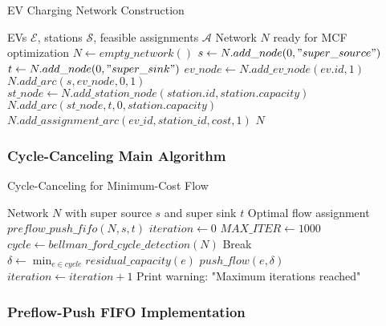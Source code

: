 \documentclass[12pt,a4paper]{article}
\begin{document}
\begin{algorithm}
\caption{EV Charging Network Construction}
\begin{algorithmic}[1]
\REQUIRE EVs $\mathcal{E}$, stations $\mathcal{S}$, feasible assignments $\mathcal{A}$
\ENSURE Network $N$ ready for MCF optimization
\STATE $N \leftarrow empty\_network()$
\STATE $s \leftarrow N.add\_node(0, "super\_source")$ 
\STATE $t \leftarrow N.add\_node(0, "super\_sink")$ 
    \STATE $ev\_node \leftarrow N.add\_ev\_node(ev.id, 1)$ 
    \STATE $N.add\_arc(s, ev\_node, 0, 1)$ 
\ENDFOR
{}
    \STATE $st\_node \leftarrow N.add\_station\_node(station.id, station.capacity)$
    \STATE $N.add\_arc(st\_node, t, 0, station.capacity)$ 
\ENDFOR
{}
    \STATE $N.add\_assignment\_arc(ev\_id, station\_id, cost, 1)$
\ENDFOR
\RETURN $N$
\end{algorithmic}
\end{algorithm}

\subsubsection{Cycle-Canceling Main Algorithm}

\begin{algorithm}
\caption{Cycle-Canceling for Minimum-Cost Flow}
\begin{algorithmic}[1]
\REQUIRE Network $N$ with super source $s$ and super sink $t$
\ENSURE Optimal flow assignment
\STATE $preflow\_push\_fifo(N, s, t)$ 
\STATE $iteration \leftarrow 0$
\STATE $MAX\_ITER \leftarrow 1000$
    \STATE $cycle \leftarrow bellman\_ford\_cycle\_detection(N)$
        \STATE Break 
    \ENDIF
    \STATE $\delta \leftarrow \min_{e \in cycle} residual\_capacity(e)$
        \STATE $push\_flow(e, \delta)$
    \ENDFOR
    \STATE $iteration \leftarrow iteration + 1$
\ENDWHILE
{}
    \STATE Print warning: "Maximum iterations reached"
\ENDIF
\end{algorithmic}
\end{algorithm}

\subsubsection{Preflow-Push FIFO Implementation}
\end{document}

